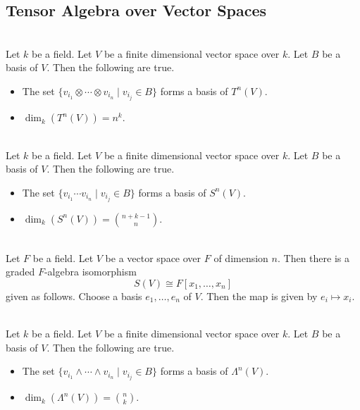 \documentclass[a4paper]{article}
\begin{document}
\subsection{Tensor Algebra over Vector Spaces}
\begin{prp}{}{}\\
Let $k$ be a field. Let $V$ be a finite dimensional vector space over $k$. Let $B$ be a basis of $V$. Then the following are true. 
\begin{itemize}
\item The set $\{v_{i_1}\otimes\cdots\otimes v_{i_n}\;|\;v_{i_j}\in B\}$ forms a basis of $T^n(V)$. 
\item $\dim_k(T^n(V))=n^k$. 
\end{itemize}
\end{prp}

\begin{prp}{}{}\\
Let $k$ be a field. Let $V$ be a finite dimensional vector space over $k$. Let $B$ be a basis of $V$. Then the following are true. 
\begin{itemize}
\item The set $\{v_{i_1}\cdots v_{i_n}\;|\;v_{i_j}\in B\}$ forms a basis of $S^n(V)$. 
\item $\dim_k(S^n(V))=\binom{n+k-1}{n}$. 
\end{itemize}
\end{prp}

\begin{crl}{}{}\\
Let $F$ be a field. Let $V$ be a vector space over $F$ of dimension $n$. Then there is a graded $F$-algebra isomorphism $$S(V)\cong F[x_1,\dots,x_n]$$ given as follows. Choose a basis $e_1,\dots,e_n$ of $V$. Then the map is given by $e_i\mapsto x_i$. 
\end{crl}

\begin{prp}{}{}\\
Let $k$ be a field. Let $V$ be a finite dimensional vector space over $k$. Let $B$ be a basis of $V$. Then the following are true. 
\begin{itemize}
\item The set $\{v_{i_1}\wedge\cdots\wedge v_{i_n}\;|\;v_{i_j}\in B\}$ forms a basis of $\Lambda^n(V)$. 
\item $\dim_k(\Lambda^n(V))=\binom{n}{k}$. 
\end{itemize}
\end{prp}
\end{document}
